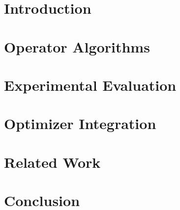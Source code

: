 \documentclass[oneside,12pt]{IIScthesisPSnPDF}
\newcommand{\blankpage}{
\newpage
\thispagestyle{empty}
\mbox{}
\newpage
}
\newcommand{\blankpagewithnumber}{
\newpage
\mbox{}
\newpage
}
\begin{document}

\setcounter{secnumdepth}{3}
\setcounter{tocdepth}{3}

\frontmatter %


% 
% 



% 
\tableofcontents
\listoffigures
\listoftables

\mainmatter %
\setcounter{page}{1}
\chapter{Introduction}



\chapter{Operator Algorithms}




\chapter{Experimental Evaluation}



\chapter{Optimizer Integration}


\chapter{Related Work}


\chapter{Conclusion}




% 
% 
% 
% 
% 

% 
% 


%
%

\end{document}
